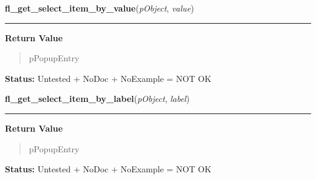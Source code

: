 \hspace{.8\funcindent}\begin{boxedminipage}{\funcwidth}

    \raggedright \textbf{fl\_get\_select\_item\_by\_value}(\textit{pObject}, \textit{value})

    \vspace{-1.5ex}

    \rule{\textwidth}{0.5\fboxrule}
\setlength{\parskip}{2ex}
\setlength{\parskip}{1ex}
      \textbf{Return Value}
    \vspace{-1ex}

      \begin{quote}
      pPopupEntry

      \end{quote}

\textbf{Status:} Untested + NoDoc + NoExample = NOT OK



    \end{boxedminipage}

    \label{xformslib:library:fl_get_select_item_by_label}

    \vspace{0.5ex}

\hspace{.8\funcindent}\begin{boxedminipage}{\funcwidth}

    \raggedright \textbf{fl\_get\_select\_item\_by\_label}(\textit{pObject}, \textit{label})

    \vspace{-1.5ex}

    \rule{\textwidth}{0.5\fboxrule}
\setlength{\parskip}{2ex}
\setlength{\parskip}{1ex}
      \textbf{Return Value}
    \vspace{-1ex}

      \begin{quote}
      pPopupEntry

      \end{quote}

\textbf{Status:} Untested + NoDoc + NoExample = NOT OK



    \end{boxedminipage}

    \label{xformslib:library:fl_get_select_item_by_text}

